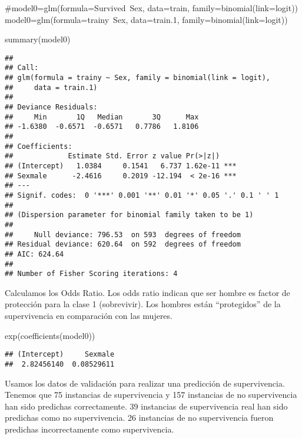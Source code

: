 \documentclass[
]{article}
\newenvironment{Shaded}{\begin{snugshade}}{\end{snugshade}}
\newcommand{\CommentTok}[1]{\textcolor[rgb]{0.50,0.62,0.50}{#1}}
\newcommand{\DataTypeTok}[1]{\textcolor[rgb]{0.87,0.87,0.75}{#1}}
\newcommand{\FloatTok}[1]{\textcolor[rgb]{0.75,0.75,0.82}{#1}}
\newcommand{\KeywordTok}[1]{\textcolor[rgb]{0.94,0.87,0.69}{#1}}
\newcommand{\NormalTok}[1]{\textcolor[rgb]{0.80,0.80,0.80}{#1}}
\newcommand{\OperatorTok}[1]{\textcolor[rgb]{0.94,0.94,0.82}{#1}}
\begin{document}
\begin{Shaded}
\begin{Highlighting}[]
\CommentTok{#model0=glm(formula=Survived~Sex, data=train, family=binomial(link=logit))}
\NormalTok{model0=}\KeywordTok{glm}\NormalTok{(}\DataTypeTok{formula=}\NormalTok{trainy}\OperatorTok{~}\NormalTok{Sex, }\DataTypeTok{data=}\NormalTok{train}\FloatTok{.1}\NormalTok{, }\DataTypeTok{family=}\KeywordTok{binomial}\NormalTok{(}\DataTypeTok{link=}\NormalTok{logit))}

\KeywordTok{summary}\NormalTok{(model0)}
\end{Highlighting}
\end{Shaded}

\begin{verbatim}
## 
## Call:
## glm(formula = trainy ~ Sex, family = binomial(link = logit), 
##     data = train.1)
## 
## Deviance Residuals: 
##     Min       1Q   Median       3Q      Max  
## -1.6380  -0.6571  -0.6571   0.7786   1.8106  
## 
## Coefficients:
##             Estimate Std. Error z value Pr(>|z|)    
## (Intercept)   1.0384     0.1541   6.737 1.62e-11 ***
## Sexmale      -2.4616     0.2019 -12.194  < 2e-16 ***
## ---
## Signif. codes:  0 '***' 0.001 '**' 0.01 '*' 0.05 '.' 0.1 ' ' 1
## 
## (Dispersion parameter for binomial family taken to be 1)
## 
##     Null deviance: 796.53  on 593  degrees of freedom
## Residual deviance: 620.64  on 592  degrees of freedom
## AIC: 624.64
## 
## Number of Fisher Scoring iterations: 4
\end{verbatim}

Calculamos los Odds Ratio. Los odds ratio indican que ser hombre es
factor de protección para la clase 1 (sobrevivir). Los hombres están
``protegidos'' de la supervivencia en comparación con las mujeres.

\begin{Shaded}
\begin{Highlighting}[]
\KeywordTok{exp}\NormalTok{(}\KeywordTok{coefficients}\NormalTok{(model0))}
\end{Highlighting}
\end{Shaded}

\begin{verbatim}
## (Intercept)     Sexmale 
##  2.82456140  0.08529611
\end{verbatim}

Usamos los datos de validación para realizar una predicción de
supervivencia. Tenemos que 75 instancias de supervivencia y 157
instancias de no supervivencia han sido predichas correctamente. 39
instancias de supervivencia real han sido predichas como no
supervivencia. 26 instancias de no supervivencia fueron predichas
incorrectamente como supervivencia.
\end{document}
